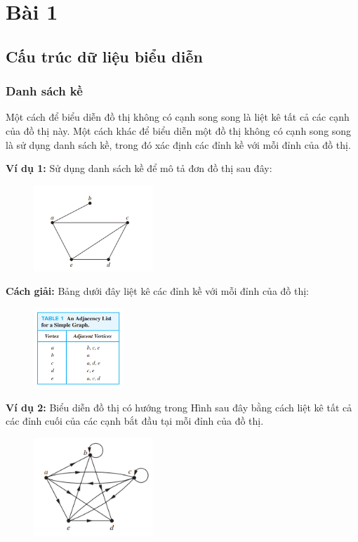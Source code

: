 
\section{Bài 1}
\subsection{Cấu trúc dữ liệu biểu diễn}
\subsubsection{Danh sách kề}
Một cách để biểu diễn đồ thị không có cạnh song song là liệt kê tất cả các cạnh của đồ thị này. Một cách khác để biểu diễn một đồ thị không có cạnh song song là sử dụng danh sách kề, trong đó xác định các đỉnh kề với mỗi đỉnh của đồ thị.

\textbf{Ví dụ 1:}
Sử dụng danh sách kề để mô tả đơn đồ thị sau đây:
\begin{figure}[H] %
    \centering %
    \includegraphics[width=0.4\textwidth]{assets/pic1.png} 
\end{figure}

\textbf{Cách giải:} Bảng dưới đây liệt kê các đỉnh kề với mỗi đỉnh của đồ thị:

\begin{figure}[H] %
    \centering %
    \includegraphics[width=0.3\textwidth]{assets/pic2.png} 
    \label{fig:gr_01}
\end{figure}

\textbf{Ví dụ 2:}
Biểu diễn đồ thị có hướng trong Hình sau đây bằng cách liệt kê tất cả các đỉnh cuối của các cạnh bắt đầu tại mỗi đỉnh của đồ thị.
\begin{figure}[H] %
    \centering %
    \includegraphics[width=0.4\textwidth]{assets/pic1.1.png} 
\end{figure}

